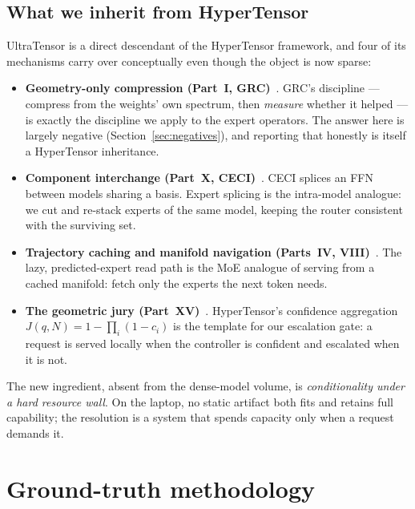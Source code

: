 \documentclass[11pt]{article}
\begin{document}
\subsection{What we inherit from HyperTensor}
\label{sec:inherit}

UltraTensor is a direct descendant of the HyperTensor framework, and four of its
mechanisms carry over conceptually even though the object is now sparse:

\begin{itemize}[leftmargin=1.4em]
  \item \textbf{Geometry-only compression (Part~I, GRC)}~\cite{stewart2026grc}.
    GRC's discipline --- compress from the weights' own spectrum, then
    \emph{measure} whether it helped --- is exactly the discipline we apply to
    the expert operators. The answer here is largely negative
    (Section~\ref{sec:negatives}), and reporting that honestly is itself a
    HyperTensor inheritance.
  \item \textbf{Component interchange (Part~X, CECI)}~\cite{stewart2026ceci}.
    CECI splices an FFN between models sharing a basis. Expert splicing is the
    intra-model analogue: we cut and re-stack experts of the same model, keeping
    the router consistent with the surviving set.
  \item \textbf{Trajectory caching and manifold navigation (Parts~IV,
    VIII)}~\cite{stewart2026ott,stewart2026gtc}. The lazy, predicted-expert read
    path is the MoE analogue of serving from a cached manifold: fetch only the
    experts the next token needs.
  \item \textbf{The geometric jury (Part~XV)}~\cite{stewart2026cog}. HyperTensor's
    confidence aggregation $J(q,N)=1-\prod_i(1-c_i)$ is the template for our
    escalation gate: a request is served locally when the controller is
    confident and escalated when it is not.
\end{itemize}

The new ingredient, absent from the dense-model volume, is \emph{conditionality
under a hard resource wall}. On the laptop, no static artifact both fits and
retains full capability; the resolution is a system that spends capacity only
when a request demands it.

\section{Ground-truth methodology}
\label{sec:oracles}
\end{document}
